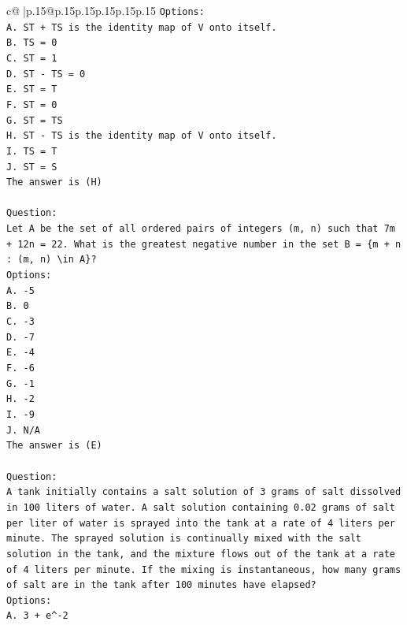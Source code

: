 \documentclass{article}
\begin{document}
{\begin{supertabular}{c@{$\;$}|p{.15\linewidth}@{}p{.15\linewidth}p{.15\linewidth}p{.15\linewidth}p{.15\linewidth}p{.15\linewidth}}
{{{\texttt{Options:} \\
\texttt{A. ST + TS is the identity map of V onto itself.} \\
\texttt{B. TS = 0} \\
\texttt{C. ST = 1} \\
\texttt{D. ST {-} TS = 0} \\
\texttt{E. ST = T} \\
\texttt{F. ST = 0} \\
\texttt{G. ST = TS} \\
\texttt{H. ST {-} TS is the identity map of V onto itself.} \\
\texttt{I. TS = T} \\
\texttt{J. ST = S} \\
\texttt{The answer is (H)} \\
\\ 
\texttt{Question:} \\
\texttt{Let A be the set of all ordered pairs of integers (m, n) such that 7m + 12n = 22. What is the greatest negative number in the set B = \{m + n : (m, n) \textbackslash{}in A\}?} \\
\texttt{Options:} \\
\texttt{A. {-}5} \\
\texttt{B. 0} \\
\texttt{C. {-}3} \\
\texttt{D. {-}7} \\
\texttt{E. {-}4} \\
\texttt{F. {-}6} \\
\texttt{G. {-}1} \\
\texttt{H. {-}2} \\
\texttt{I. {-}9} \\
\texttt{J. N/A} \\
\texttt{The answer is (E)} \\
\\ 
\texttt{Question:} \\
\texttt{A tank initially contains a salt solution of 3 grams of salt dissolved in 100 liters of water. A salt solution containing 0.02 grams of salt per liter of water is sprayed into the tank at a rate of 4 liters per minute. The sprayed solution is continually mixed with the salt solution in the tank, and the mixture flows out of the tank at a rate of 4 liters per minute. If the mixing is instantaneous, how many grams of salt are in the tank after 100 minutes have elapsed?} \\
\texttt{Options:} \\
\texttt{A. 3 + e\^{}{-}2} \\
}}}
\end{supertabular}}
\end{document}

